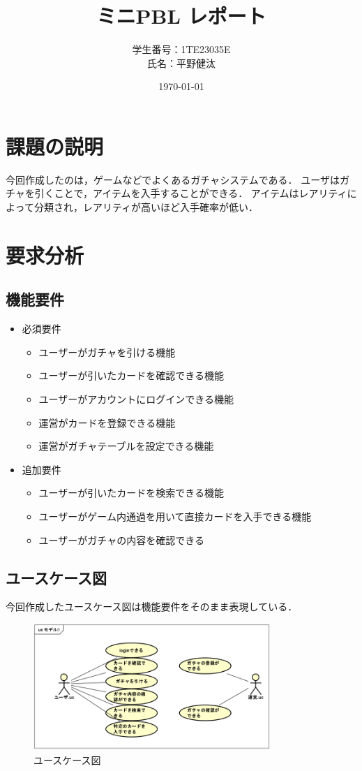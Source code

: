 \documentclass{ltjsarticle}
\title{ミニPBL レポート}
\author{学生番号：1TE23035E\\氏名：平野健汰}
\date{\today}
\begin{document}
\maketitle
\tableofcontents
\newpage

\section{課題の説明}
今回作成したのは，ゲームなどでよくあるガチャシステムである．
ユーザはガチャを引くことで，アイテムを入手することができる．
アイテムはレアリティによって分類され，レアリティが高いほど入手確率が低い．

\section{要求分析}
\subsection{機能要件}
\begin{itemize}
  \item 必須要件
  \begin{itemize}
    \item ユーザーがガチャを引ける機能
    \item ユーザーが引いたカードを確認できる機能
    \item ユーザーがアカウントにログインできる機能
    \item 運営がカードを登録できる機能
    \item 運営がガチャテーブルを設定できる機能
  \end{itemize}
  \item 追加要件
  \begin{itemize}
    \item ユーザーが引いたカードを検索できる機能
    \item ユーザーがゲーム内通過を用いて直接カードを入手できる機能
    \item ユーザーがガチャの内容を確認できる
  \end{itemize}
\end{itemize}

\subsection{ユースケース図}
今回作成したユースケース図は機能要件をそのまま表現している．
\begin{figure}[H]
    \centering
    \includegraphics[width=0.8\textwidth]{src/usecase.png}
    \caption{ユースケース図}
    \label{fig:usecase}
\end{figure}
\end{document}
